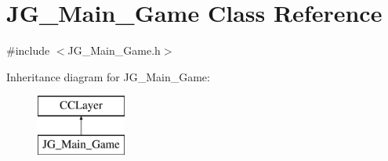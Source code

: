 \hypertarget{class_j_g___main___game}{\section{J\-G\-\_\-\-Main\-\_\-\-Game Class Reference}
\label{class_j_g___main___game}
}


{\ttfamily \#include $<$J\-G\-\_\-\-Main\-\_\-\-Game.\-h$>$}

Inheritance diagram for J\-G\-\_\-\-Main\-\_\-\-Game\-:\begin{figure}[H]
\begin{center}
\leavevmode
\includegraphics[height=2.000000cm]{class_j_g___main___game}
\end{center}
\end{figure}
